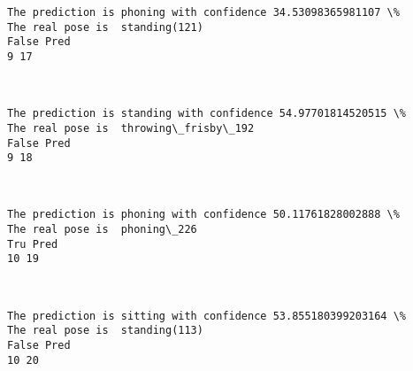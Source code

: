 \documentclass[11pt]{article}
\begin{document}
    \begin{Verbatim}[commandchars=\\\{\}]
The prediction is phoning with confidence 34.53098365981107 \%
The real pose is  standing(121)
False Pred
9 17

    \end{Verbatim}

    \begin{center}
    \end{center}
    { \hspace*{\fill} \\}
    
    \begin{Verbatim}[commandchars=\\\{\}]
The prediction is standing with confidence 54.97701814520515 \%
The real pose is  throwing\_frisby\_192
False Pred
9 18

    \end{Verbatim}

    \begin{center}
    \end{center}
    { \hspace*{\fill} \\}
    
    \begin{Verbatim}[commandchars=\\\{\}]
The prediction is phoning with confidence 50.11761828002888 \%
The real pose is  phoning\_226
Tru Pred
10 19

    \end{Verbatim}

    \begin{center}
    \end{center}
    { \hspace*{\fill} \\}
    
    \begin{Verbatim}[commandchars=\\\{\}]
The prediction is sitting with confidence 53.855180399203164 \%
The real pose is  standing(113)
False Pred
10 20

    \end{Verbatim}

    \begin{center}
    \end{center}
    { \hspace*{\fill} \\}
    
\end{document}
